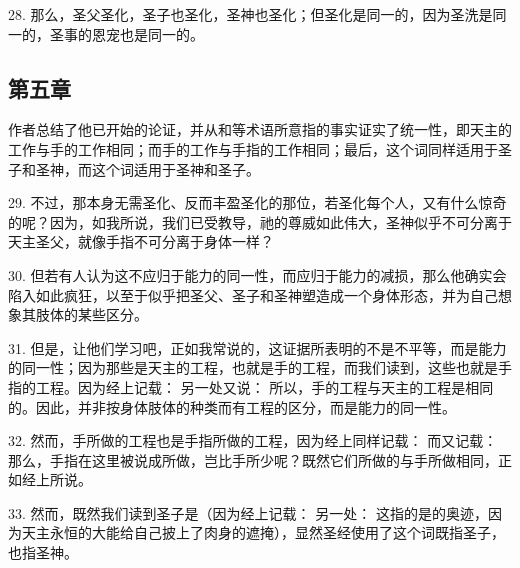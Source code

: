 28. 那么，圣父圣化，圣子也圣化，圣神也圣化；但圣化是同一的，因为圣洗是同一的，圣事的恩宠也是同一的。\par


\subsection{第五章}

作者总结了他已开始的论证，并从和等术语所意指的事实证实了统一性，即天主的工作与手的工作相同；而手的工作与手指的工作相同；最后，这个词同样适用于圣子和圣神，而这个词适用于圣神和圣子。\par

29. 不过，那本身无需圣化、反而丰盈圣化的那位，若圣化每个人，又有什么惊奇的呢？因为，如我所说，我们已受教导，祂的尊威如此伟大，圣神似乎不可分离于天主圣父，就像手指不可分离于身体一样？\par

30. 但若有人认为这不应归于能力的同一性，而应归于能力的减损，那么他确实会陷入如此疯狂，以至于似乎把圣父、圣子和圣神塑造成一个身体形态，并为自己想象其肢体的某些区分。\par

31. 但是，让他们学习吧，正如我常说的，这证据所表明的不是不平等，而是能力的同一性；因为那些是天主的工程，也就是手的工程，而我们读到，这些也就是手指的工程。因为经上记载： 另一处又说： 所以，手的工程与天主的工程是相同的。因此，并非按身体肢体的种类而有工程的区分，而是能力的同一性。\par

32. 然而，手所做的工程也是手指所做的工程，因为经上同样记载： 而又记载： 那么，手指在这里被说成所做，岂比手所少呢？既然它们所做的与手所做相同，正如经上所说。\par

33. 然而，既然我们读到圣子是（因为经上记载： 另一处： 这指的是的奥迹，因为天主永恒的大能给自己披上了肉身的遮掩），显然圣经使用了这个词既指圣子，也指圣神。\par

